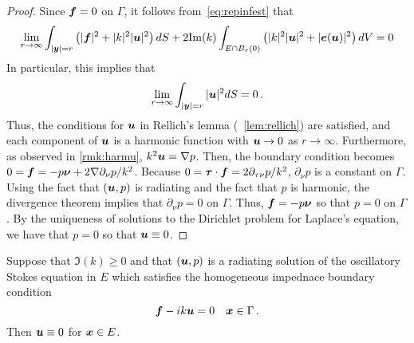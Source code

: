 \begin{proof}
Since ${\boldsymbol f} = 0$ on $\Gamma$, it follows
from~\cref{eq:repinfest} that
\begin{equation}
\lim_{r\to\infty}
\int_{|{\boldsymbol y}|=r} \left( |{\boldsymbol f}|^2 + |k|^2 |{\boldsymbol u}|^2 \right) dS +
2 {\textrm{\textup{Im}}}(k) \int_{E \cap B_{r}(0)} \left(|k|^2 |{\boldsymbol u}|^2 + |{\boldsymbol e}({\boldsymbol u})|^2 \right)
dV = 0
\end{equation} 
In particular, this implies that
\begin{equation}
\lim_{r\to\infty} \int_{|{\boldsymbol y}|=r} |{\boldsymbol u}|^2 dS = 0 \, .
\end{equation}
Thus, the conditions for ${\boldsymbol u}$ in Rellich's lemma (~\cref{lem:rellich})
are satisfied, and each component of ${\boldsymbol u}$ is a harmonic function
with ${\boldsymbol u} \to 0$ as $r \to \infty$. Furthermore, as observed
in \cref{rmk:harmu}, $k^2 {\boldsymbol u} = \nabla p$. Then, the boundary
condition becomes $0 = {\boldsymbol f} = -p {\boldsymbol \nu} + 2 \nabla \partial_\nu p/k^2$.
Because $0 = {\boldsymbol \tau} \cdot {\boldsymbol f} = 2\partial_{\tau\nu} p/k^2$,
$\partial_\nu p $ is a constant on $\Gamma$. Using the
fact that $({\boldsymbol u},p)$ is radiating and the fact that $p$ is harmonic,
the divergence theorem implies that $\partial_\nu p=0$ on $\Gamma$.
Thus, ${\boldsymbol f} = -p{\boldsymbol \nu}$ so that $p = 0$ on $\Gamma$. By the uniqueness
of solutions to the Dirichlet problem for Laplace's equation,
we have that $p=0$ so that ${\boldsymbol u} \equiv 0$.

\end{proof}

\begin{thrm}
Suppose that $\Im(k) \geq 0$ and that
$({\boldsymbol u},p)$ is a radiating solution of the
oscillatory Stokes equation in $E$ which satisfies
the homogeneous impednace boundary condition
\begin{equation}
{\boldsymbol f} - i k {\boldsymbol u} = 0 \quad {\boldsymbol x} \in \Gamma \, .
\end{equation}
Then ${\boldsymbol u} \equiv 0$ for ${\boldsymbol x} \in E$.
\end{thrm}

